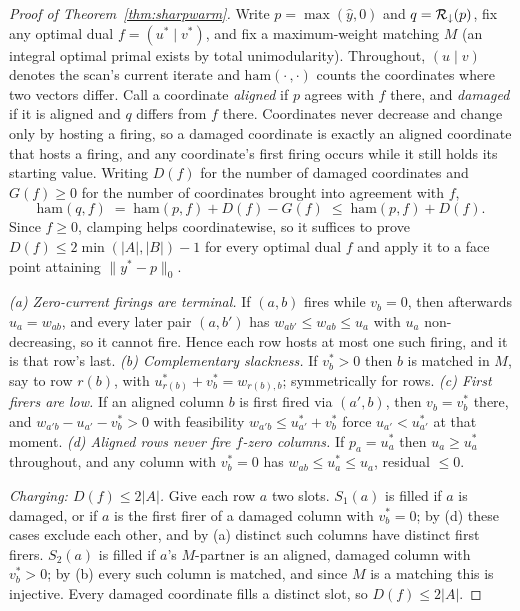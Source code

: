\begin{proof}[Proof of Theorem~\ref{thm:sharpwarm}]
Write $p = \max(\hat{y},0)$ and $q = \mathcal{R}_{\downarrow}(p)$, fix any optimal dual
$f = (u^* \mid v^*)$, and fix a maximum-weight matching $M$ (an integral optimal primal exists by
total unimodularity). Throughout, $(u \mid v)$ denotes the scan's current iterate and
$\mathrm{ham}(\cdot\,,\cdot)$ counts the coordinates where two vectors differ. Call a coordinate
\emph{aligned} if $p$ agrees with $f$ there, and
\emph{damaged} if it is aligned and $q$ differs from $f$ there. Coordinates never decrease and
change only by hosting a firing, so a damaged coordinate is exactly an aligned coordinate that
hosts a firing, and any coordinate's first firing occurs while it still holds its starting value.
Writing $D(f)$ for the number of damaged coordinates and $G(f) \ge 0$ for the number of
coordinates brought into agreement with $f$,
\[
\mathrm{ham}(q, f) \;=\; \mathrm{ham}(p, f) + D(f) - G(f) \;\le\; \mathrm{ham}(p, f) + D(f).
\]
Since $f \ge 0$, clamping helps coordinatewise, so it suffices to prove
$D(f) \le 2\min(|A|,|B|) - 1$ for every optimal dual $f$ and apply it to a face point attaining
$\|y^* - p\|_0$.

\emph{(a) Zero-current firings are terminal.} If $(a,b)$ fires while $v_b = 0$,
then afterwards $u_a = w_{ab}$, and every later pair $(a, b')$ has $w_{ab'} \le w_{ab} \le u_a$
with $u_a$ non-decreasing, so it cannot fire. Hence each row hosts at most one such firing, and it
is that row's last. \emph{(b) Complementary slackness.} If $v^*_b > 0$ then $b$ is matched in $M$,
say to row $r(b)$, with $u^*_{r(b)} + v^*_b = w_{r(b),b}$; symmetrically for rows.
\emph{(c) First firers are low.} If an aligned column $b$ is first fired via $(a', b)$, then
$v_b = v^*_b$ there, and $w_{a'b} - u_{a'} - v^*_b > 0$ with feasibility
$w_{a'b} \le u^*_{a'} + v^*_b$ force $u_{a'} < u^*_{a'}$ at that moment.
\emph{(d) Aligned rows never fire $f$-zero columns.} If $p_a = u^*_a$ then $u_a \ge u^*_a$
throughout, and any column with $v^*_b = 0$ has $w_{ab} \le u^*_a \le u_a$, residual $\le 0$.

\emph{Charging: $D(f) \le 2|A|$.} Give each row $a$ two slots. $S_1(a)$ is filled if $a$ is
damaged, or if $a$ is the first firer of a damaged column with $v^*_b = 0$; by (d) these cases
exclude each other, and by (a) distinct such columns have distinct first firers. $S_2(a)$ is
filled if $a$'s $M$-partner is an aligned, damaged column with $v^*_b > 0$; by (b) every such
column is matched, and since $M$ is a matching this is injective. Every damaged coordinate fills
a distinct slot, so $D(f) \le 2|A|$.


\end{proof}
